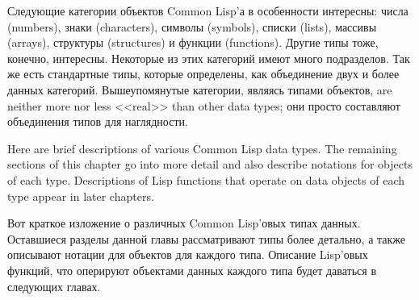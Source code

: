 Следующие категории объектов Common Lisp'а в особенности
интересны: числа (numbers), знаки (characters), символы (symbols),
списки (lists), массивы (arrays), структуры (structures) и функции
(functions). Другие типы тоже, конечно, интересны. Некоторые из
этих категорий имеют много подразделов. Так же есть стандартные
типы, которые определены, как объединение двух и более данных
категорий. Вышеупомянутые категории, являясь типами объектов, are
neither more nor less <<real>> than other data types; они просто
составляют объединения типов для наглядности. 

Here are brief descriptions of various Common Lisp data types.
The remaining sections of this chapter go into more detail
and also describe notations for objects
of each type.  Descriptions of Lisp functions that operate
on data objects of each type appear in later chapters.

Вот краткое изложение о различных Common Lisp'овых типах
данных. Оставшиеся разделы данной главы рассматривают типы более
детально, а также описывают нотации для объектов для каждого
типа. Описание Lisp'овых функций, что оперируют объектами данных
каждого типа будет даваться в следующих главах. 

